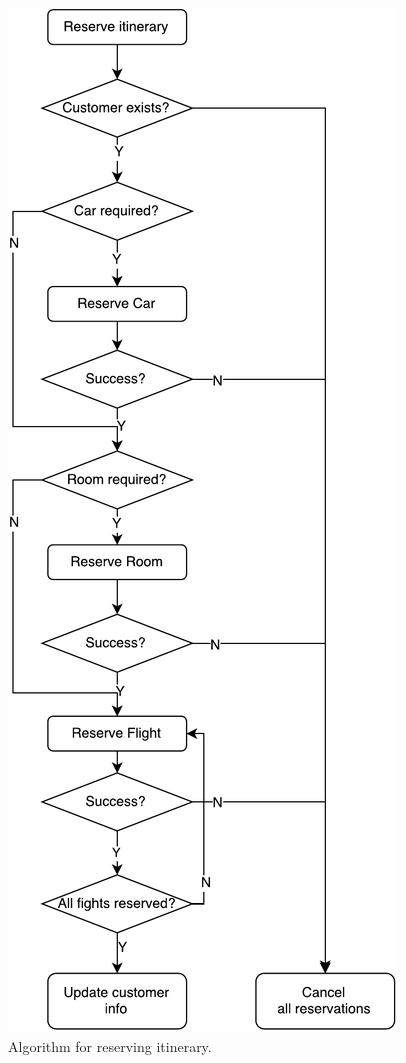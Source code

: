 \documentclass{article}
\begin{document}
\begin{figure}
\centering
\includegraphics[scale=0.6]{figures/res-itin}
\caption{Algorithm for reserving itinerary.}
\label{f:res-itin}
\end{figure}
\end{document}
